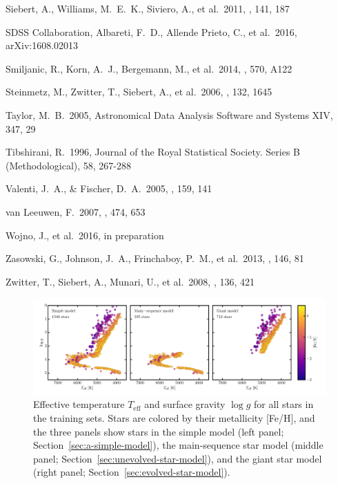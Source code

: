 \documentclass[preprint]{aastex61}
\newcommand{\teff}{T_{\mathrm{eff}}}
\newcommand{\logg}{\log g}
\begin{document}
\begin{thebibliography}{dummy}
 Siebert, A., Williams, M.~E.~K., Siviero, A., et al.\ 2011, \aj, 141, 187 

 SDSS Collaboration, Albareti, F.~D., Allende Prieto, C., et al.\ 2016, arXiv:1608.02013 

 Smiljanic, R., Korn, A.~J., Bergemann, M., et al.\ 2014, \aap, 570, A122 

 Steinmetz, M., Zwitter, T., Siebert, A., et al.\ 2006, \aj, 132, 1645 

 Taylor, M.~B.\ 2005, Astronomical Data Analysis Software and Systems XIV, 347, 29 

 Tibshirani, R.\ 1996, Journal of the Royal Statistical Society. Series B (Methodological), 58, 267-288

 Valenti, J.~A., \& Fischer, D.~A.\ 2005, \apjs, 159, 141 

 van Leeuwen, F.\ 2007, \aap, 474, 653 

 Wojno, J., et al.\ 2016, in preparation

 Zasowski, G., Johnson, J.~A., Frinchaboy, P.~M., et al.\ 2013, \aj, 146, 81 

 Zwitter, T., Siebert, A., Munari, U., et al.\ 2008, \aj, 136, 421 

\end{thebibliography}



\clearpage

\begin{figure}[p]
\includegraphics[width=\textwidth]{figures/hrd-train-set.pdf}
\caption{Effective temperature $\teff$ and surface gravity $\logg$ for all stars in the training sets. Stars are colored by their metallicity [Fe/H], and the three panels show stars in the simple model (left panel; Section~\ref{sec:a-simple-model}), the main-sequence star model (middle panel; Section~\ref{sec:unevolved-star-model}), and the giant star model (right panel; Section~\ref{sec:evolved-star-model}).\label{fig:training-set-hrd}}
\end{figure}
\end{document}
